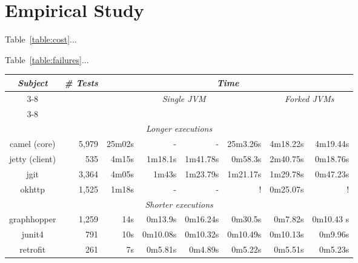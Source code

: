 \section{Empirical Study}

Table~\ref{table:cost}...

Table~\ref{table:failures}...

\begin{table*}[t]
  \centering
  \begin{tabular}{|c|r|r|r|r|r|r|r|}
    \hline
    \multirow{2}{*}{\emph{Subject}} & \multirow{2}{*}{\emph{\# Tests}} &  \multicolumn{6}{c|}{\emph{Time}}\\
    \cline{3-8}
    & & \multicolumn{4}{c|}{\emph{Single JVM}} & \multicolumn{2}{c|}{\emph{Forked JVMs}} \\
    \cline{3-8}
    & &  \multicolumn{1}{c|}{\Seq{}} &
    \multicolumn{1}{c|}{\ParClassSeqMeth{}} &
    \multicolumn{1}{c|}{\SeqClassParMeth{}} &
    \multicolumn{1}{c|}{\ParClassParMeth{}} &
    \multicolumn{1}{c|}{\Seq{}} &
    \multicolumn{1}{c|}{\ParClassSeqMeth{}}\\
    \hline
    \hline
    \multicolumn{8}{|c|}{\emph{Longer executions}} \\
    \hline
    camel (core) & 5,979 & 25m02s & - & - & 25m3.26s & 4m18.22s & 4m19.44s \\
    \hline
    jetty (client) & 535 & 4m15s & 1m18.1s & 1m41.78s & 0m58.3s &  2m40.75s & 0m18.76s \\
    \hline
    jgit & 3,364 & 4m05s & 1m43s & 1m23.79s & 1m21.17s & 1m29.78s  & 0m47.23s \\      \hline
    okhttp & 1,525 & 1m18s & - & - & ! & 0m25.07s & ! \\
    \hline    
    \hline
    \multicolumn{8}{|c|}{\emph{Shorter executions}} \\
    \hline
    graphhopper & 1,259 & 14s & 0m13.9s & 0m16.24s & 0m30.5s & 0m7.82s & 0m10.43 s \\
    \hline
    junit4 & 791 & 10s & 0m10.08s & 0m10.32s & 0m10.49s & 0m10.13s & 0m9.96s \\
    \hline
    retrofit & 261 & 7s & 0m5.81s & 0m4.89s & 0m5.22s & 0m5.51s & 0m5.23s \\
    \hline
  \end{tabular}
  \caption{\label{table:cost}Test execution time.}
\end{table*}


